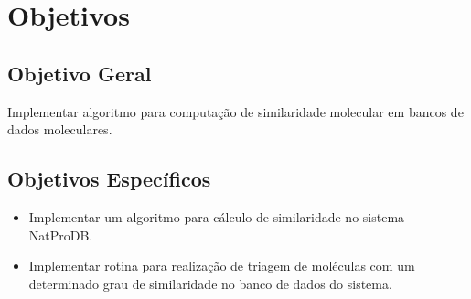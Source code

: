                   

\section{Objetivos}

\subsection{Objetivo Geral}

Implementar algoritmo para computação de similaridade molecular em bancos de dados moleculares.

\subsection{Objetivos Espec\'ificos}

\begin{itemize}
	\item Implementar um algoritmo para cálculo de similaridade no sistema NatProDB.
	\item Implementar rotina para realização de triagem de moléculas com um determinado grau de similaridade no banco de dados do sistema.
\end{itemize}


